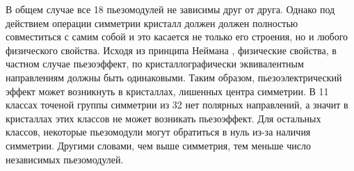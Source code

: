 В общем случае все 18 пьезомодулей не зависимы друг от друга. Однако
под действием операции симметрии кристалл должен должен полностью совместиться с
самим собой и это касается не только его строения, но и любого физического свойства.
Исходя из принципа Неймана \cite{Shaskolska_1984}, физические свойства, в частном случае
пьезоэффект, по кристаллографически эквивалентным направлениям должны быть одинаковыми.
Таким образом, пьезоэлектрический эффект может возникнуть в кристаллах, лишенных центра
симметрии. В 11 классах точеной группы симметрии из 32 нет полярных направлений,
а значит в кристаллах этих классов не может возникать пьезоэффект. Для остальных
классов, некоторые пьезомодули могут обратиться в нуль из-за наличия симметрии.
Другими словами, чем выше симметрия, тем меньше число независимых пьезомодулей.
